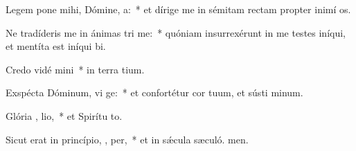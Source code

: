 \item Legem pone mihi, Dómine,   a:~* et dírige me in sémitam rectam propter inimí os.
\item Ne tradíderis me in ánimas tri me:~* quóniam insurrexérunt in me testes iníqui, et mentíta est iníqui bi.
\item Credo vidé  mini~* in terra tium.
\item Exspécta Dóminum, vi ge:~* et confortétur cor tuum, et sústi minum.
\item Glória ,  lio,~* et Spirítu to.
\item Sicut erat in princípio,  ,  per,~* et in sǽcula sæculó. men.

